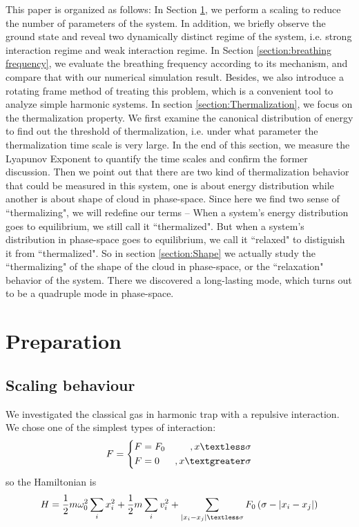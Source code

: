 \documentclass[aps,preprintnumbers,onecolumn,amsmath,amssymb,floatfix,pra]{revtex4-1}
\begin{document}
This paper is organized as follows: In Section \ref{section:preparation}, we perform a scaling to
reduce the number of parameters of the system. In addition, we briefly observe the ground state and
reveal two dynamically distinct regime of the system, i.e. strong interaction regime and weak
interaction regime. In Section \ref{section:breathing frequency}, we evaluate the breathing
frequency according to its mechanism, and compare that with our numerical simulation
result. Besides, we also introduce a rotating frame method of treating this problem, which is a
convenient tool to analyze simple harmonic systems. In section \ref{section:Thermalization}, we
focus on the thermalization property. We first examine the canonical distribution of energy to find
out the threshold of thermalization, i.e. under what parameter the thermalization time scale is very
large. In the end of this section, we measure the Lyapunov Exponent to quantify the time scales and
confirm the former discussion. Then we point out that there are two kind of thermalization behavior
that could be measured in this system, one is about energy distribution while another is about shape
of cloud in phase-space. Since here we find two sense of ``thermalizing", we will redefine our terms
-- When a system's energy distribution goes to equilibrium, we still call it ``thermalized".  But
when a system's distribution in phase-space goes to equilibrium, we call it ``relaxed" to distiguish
it from ``thermalized". So in section \ref{section:Shape} we actually study the ``thermalizing" of
the shape of the cloud in phase-space, or the ``relaxation" behavior of the system. There we
discovered a long-lasting mode, which turns out to be a quadruple mode in phase-space.


\section{Preparation}\label{section:preparation}
\subsection{Scaling behaviour}
We investigated the classical gas in harmonic trap with a repulsive interaction. We chose one of the simplest types of interaction:
\begin{equation}
F=\left\lbrace
\begin{aligned}
&F=F_0 	&,x\textless\sigma\\
&F=0 	&,x\textgreater\sigma
\end{aligned}
\right.
\label{eq:preparation1}
\end{equation}
so the Hamiltonian is
\begin{equation}
H=\frac{1}{2}m\omega_0^2\sum_{i}x_i^2+\frac{1}{2}m\sum_i v_i^2+\sum_{\left|x_i-x_j\right|\textless\sigma}F_0\left(\sigma-\left|x_i-x_j\right|\right)
\label{eq:preparation2}
\end{equation}
\end{document}

